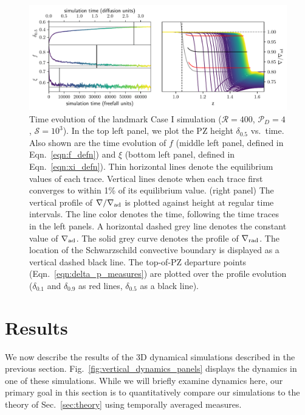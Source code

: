 \documentclass[twocolumn, linenumbers]{aastex631}
\newcommand{\gradrad}{\ensuremath{\nabla_{\rm{rad}}}}
\newcommand{\gradad}{\ensuremath{\nabla_{\rm{ad}}}}
\newcommand{\justgrad}{\ensuremath{\nabla}}
\newcommand{\mP}{\ensuremath{\mathcal{P}}}
\newcommand{\mR}{\ensuremath{\mathcal{R}}}
\newcommand{\mS}{\ensuremath{\mathcal{S}}}
\begin{document}
\begin{figure}[t]
\centering
\includegraphics[width=\textwidth]{time_evolution.pdf}
\caption{
Time evolution of the landmark Case I simulation ($\mR = 400$, $\mP_D = 4$, $\mS = 10^3$).
In the top left panel, we plot the PZ height $\delta_{0.5}$ vs.~time.
Also shown are the time evolution of $f$ (middle left panel, defined in Eqn.~\ref{eqn:f_defn}) and $\xi$ (bottom left panel, defined in Eqn.~\ref{eqn:xi_defn}).
Thin horizontal lines denote the equilibrium values of each trace.
Vertical lines denote when each trace first converges to within 1\% of its equilibrium value.
(right panel) The vertical profile of $\justgrad/\gradad$ is plotted against height at regular time intervals.
The line color denotes the time, following the time traces in the left panels.
A horizontal dashed grey line denotes the constant value of $\gradad$.
The solid grey curve denotes the profile of $\gradrad$.
The location of the Schwarzschild convective boundary is displayed as a vertical dashed black line.
The top-of-PZ departure points (Eqn.~\ref{eqn:delta_p_measures}) are plotted over the profile evolution ($\delta_{0.1}$ and $\delta_{0.9}$ as red lines, $\delta_{0.5}$ as a black line).
\label{fig:time_evolution}
}
\end{figure}


\section{Results}
\label{sec:results}

We now describe the results of the 3D dynamical simulations described in the previous section.
Fig.~\ref{fig:vertical_dynamics_panels} displays the dynamics in one of these simulations.
While we will briefly examine dynamics here, our primary goal in this section is to quantitatively compare our simulations to the theory of Sec.~\ref{sec:theory} using temporally averaged measures.
\end{document}
